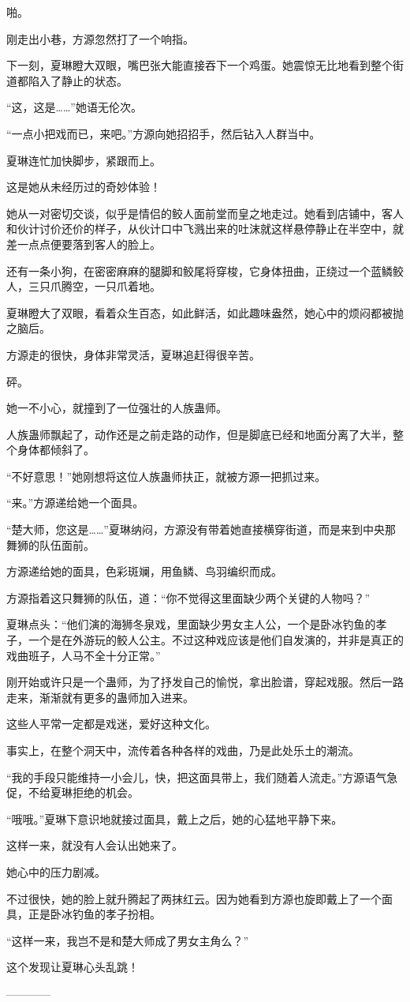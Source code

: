 \begin{this_body}
啪。

刚走出小巷，方源忽然打了一个响指。

下一刻，夏琳瞪大双眼，嘴巴张大能直接吞下一个鸡蛋。她震惊无比地看到整个街道都陷入了静止的状态。

“这，这是……”她语无伦次。

“一点小把戏而已，来吧。”方源向她招招手，然后钻入人群当中。

夏琳连忙加快脚步，紧跟而上。

这是她从未经历过的奇妙体验！

她从一对密切交谈，似乎是情侣的鲛人面前堂而皇之地走过。她看到店铺中，客人和伙计讨价还价的样子，从伙计口中飞溅出来的吐沫就这样悬停静止在半空中，就差一点点便要落到客人的脸上。

还有一条小狗，在密密麻麻的腿脚和鲛尾将穿梭，它身体扭曲，正绕过一个蓝鳞鲛人，三只爪腾空，一只爪着地。

夏琳瞪大了双眼，看着众生百态，如此鲜活，如此趣味盎然，她心中的烦闷都被抛之脑后。

方源走的很快，身体非常灵活，夏琳追赶得很辛苦。

砰。

她一不小心，就撞到了一位强壮的人族蛊师。

人族蛊师飘起了，动作还是之前走路的动作，但是脚底已经和地面分离了大半，整个身体都倾斜了。

“不好意思！”她刚想将这位人族蛊师扶正，就被方源一把抓过来。

“来。”方源递给她一个面具。

“楚大师，您这是……”夏琳纳闷，方源没有带着她直接横穿街道，而是来到中央那舞狮的队伍面前。

方源递给她的面具，色彩斑斓，用鱼鳞、鸟羽编织而成。

方源指着这只舞狮的队伍，道：“你不觉得这里面缺少两个关键的人物吗？”

夏琳点头：“他们演的海狮冬泉戏，里面缺少男女主人公，一个是卧冰钓鱼的孝子，一个是在外游玩的鲛人公主。不过这种戏应该是他们自发演的，并非是真正的戏曲班子，人马不全十分正常。”

刚开始或许只是一个蛊师，为了抒发自己的愉悦，拿出脸谱，穿起戏服。然后一路走来，渐渐就有更多的蛊师加入进来。

这些人平常一定都是戏迷，爱好这种文化。

事实上，在整个洞天中，流传着各种各样的戏曲，乃是此处乐土的潮流。

“我的手段只能维持一小会儿，快，把这面具带上，我们随着人流走。”方源语气急促，不给夏琳拒绝的机会。

“哦哦。”夏琳下意识地就接过面具，戴上之后，她的心猛地平静下来。

这样一来，就没有人会认出她来了。

她心中的压力剧减。

不过很快，她的脸上就升腾起了两抹红云。因为她看到方源也旋即戴上了一个面具，正是卧冰钓鱼的孝子扮相。

“这样一来，我岂不是和楚大师成了男女主角么？”

这个发现让夏琳心头乱跳！

------------

\end{this_body}

